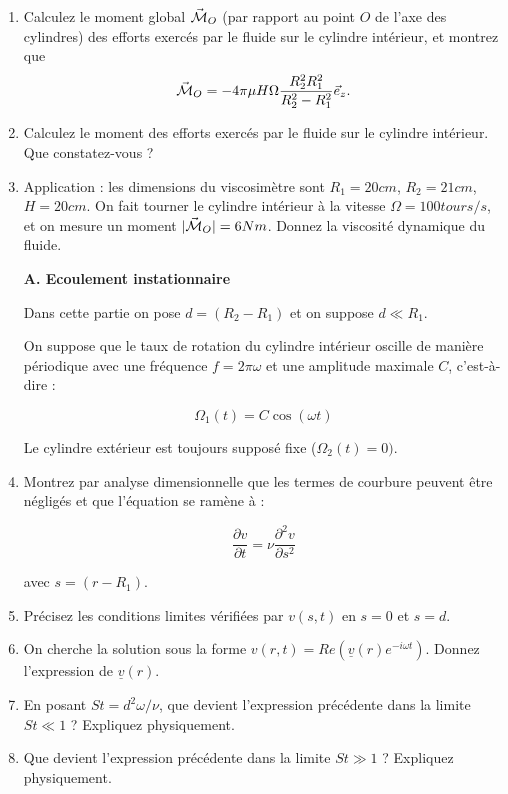 \begin{enumerate}
\item Calculez le moment global $\vec {\cal M}_O$ 
(par rapport au point $O$ de l'axe des
cylindres) des efforts exercés par le fluide sur
le cylindre intérieur, et montrez que
$$ 
\vec {\cal M}_O = - 4 \pi \mu H \Omega \frac{R_2^2 R_1^2}{R_2^2 -R_1^2} 
\vec e_z.
$$

\item Calculez le moment des efforts exercés par le fluide sur le cylindre intérieur. Que constatez-vous ?

\item Application : les dimensions du viscosimètre sont $R_1 = 20cm$, $R_2 =
21cm$, $H = 20cm$. On fait tourner le cylindre intérieur à la vitesse
$\Omega = 100 tours/s$, et on mesure un moment $|\vec {\cal M}_O| = 6 Nm$.
Donnez la viscosité dynamique du fluide. 

{\bf A. Ecoulement instationnaire}

Dans cette partie on pose $d = (R_2-R_1)$ et on suppose $d \ll R_1$.

On suppose que le taux de rotation du cylindre intérieur oscille de manière périodique avec une fréquence $f = 2 \pi \omega$ et une amplitude maximale $C$, c'est-à-dire :

$$
\Omega_1(t) = C  \cos (\omega t)
$$

Le cylindre extérieur est toujours supposé fixe ($ \Omega_2(t) = 0)$.

\item Montrez par analyse dimensionnelle que les termes de courbure peuvent être négligés et que l'équation se ramène à :

\begin{equation}
\frac{\partial v}{\partial t} = \nu \frac{\partial^2 v}{\partial s^2}
\end{equation}
 
 avec $s = (r-R_1)$.
 
 \item 
 Précisez les conditions limites vérifiées par $v(s,t)$ en $s=0$ et $s=d$.

 
\item On cherche la solution sous la forme 
$v(r,t) = Re ( \underline{v}(r) e^{-i \omega t} )$. 
Donnez l'expression de  $\underline{v}(r)$.

\item En posant $St = d^2 \omega/\nu$, que devient l'expression précédente dans la limite $St \ll 1$ ? Expliquez physiquement.

\item Que devient l'expression précédente dans la limite $St \gg 1$ ? Expliquez physiquement.


\end{enumerate}


